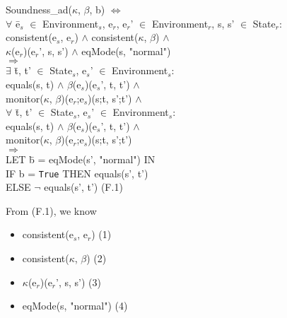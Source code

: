 \documentclass[conference]{IEEEtran}
\begin{document}
\begin{tabbing}
Soundness\_ad($\kappa$, $\beta$, b) $\Leftrightarrow$
\\$\forall$ \=e$_s$ $\in$ Environment$_s$, e$_r$, e$_r$' $\in$ Environment$_r$, s, s' $\in$ State$_r$:
\\\>consistent(e$_s$, e$_r$) $\wedge$ consistent($\kappa$, $\beta$) $\wedge$ 
\\\>\textlbrackdbl $\kappa$\textrbrackdbl(e$_r$)(e$_r$', s, s') $\wedge$ eqMode(s, "normal")
\\$\Rightarrow$
\\\>$\exists$ \=t, t' $\in$ State$_s$, e$_s$' $\in$ Environment$_s$: 
\\\>\>equals(s, t) $\wedge$ \textlbrackdbl $\beta$\textrbrackdbl(e$_s$)(e$_s$', t, t') $\wedge$ 
\\\>\> monitor($\kappa$, $\beta$)(e$_r$;e$_s$)(s;t, s';t')
$\wedge$
\\\>$\forall$ \=t, t' $\in$ State$_s$, e$_s$' $\in$ Environment$_s$: 
\\\>\>equals(s, t) $\wedge$ \textlbrackdbl $\beta$\textrbrackdbl(e$_s$)(e$_s$', t, t') $\wedge$ 
\\\>\> monitor($\kappa$, $\beta$)(e$_r$;e$_s$)(s;t, s';t')
\\\>$\Rightarrow$ \=
\\\> LET \=b = eqMode(s', "normal") IN
\\\>\>IF b = \texttt{True} THEN equals(s', t') 
\\\>\> ELSE $\neg$ equals(s', t')  \hspace*{2cm} (F.1)
\end{tabbing}

\noindent From (F.1), we know

\begin{itemize}
\item consistent(e$_s$, e$_r$)   \hspace*{4cm} (1)
\item consistent($\kappa$, $\beta$)  \hspace*{4.2cm} (2)
\item \textlbrackdbl $\kappa$\textrbrackdbl(e$_r$)(e$_r$', s, s')   \hspace*{4cm} (3)
\item eqMode(s, "normal")   \hspace*{3.52cm} (4)
\end{itemize}
\end{document}
